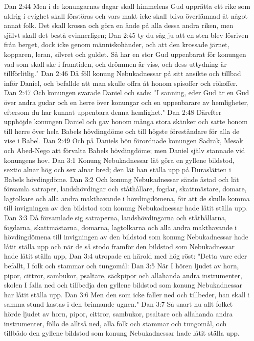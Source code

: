 Dan 2:44  Men i de konungarnas dagar skall himmelens Gud upprätta ett rike som aldrig i evighet skall förstöras och vars makt icke skall bliva överlämnad åt något annat folk. Det skall krossa och göra en ände på alla dessa andra riken, men självt skall det bestå evinnerligen;
Dan 2:45  ty du såg ju att en sten blev lösriven från berget, dock icke genom människohänder, och att den krossade järnet, kopparen, leran, silvret och guldet. Så har en stor Gud uppenbarat för konungen vad som skall ske i framtiden, och drömmen är viss, och dess uttydning är tillförlitlig."
Dan 2:46  Då föll konung Nebukadnessar på sitt ansikte och tillbad inför Daniel, och befallde att man skulle offra åt honom spisoffer och rökoffer.
Dan 2:47  Och konungen svarade Daniel och sade: "I sanning, eder Gud är en Gud över andra gudar och en herre över konungar och en uppenbarare av hemligheter, eftersom du har kunnat uppenbara denna hemlighet."
Dan 2:48  Därefter upphöjde konungen Daniel och gav honom många stora skänker och satte honom till herre över hela Babels hövdingdöme och till högste föreståndare för alla de vise i Babel.
Dan 2:49  Och på Daniels bön förordnade konungen Sadrak, Mesak och Abed-Nego att förvalta Babels hövdingdöme; men Daniel själv stannade vid konungens hov.
Dan 3:1  Konung Nebukadnessar lät göra en gyllene bildstod, sextio alnar hög och sex alnar bred; den lät han ställa upp på Duraslätten i Babels hövdingdöme.
Dan 3:2  Och konung Nebukadnessar sände åstad och lät församla satraper, landshövdingar och ståthållare, fogdar, skattmästare, domare, lagtolkare och alla andra makthavande i hövdingdömena, för att de skulle komma till invigningen av den bildstod som konung Nebukadnessar hade låtit ställa upp.
Dan 3:3  Då församlade sig satraperna, landshövdingarna och ståthållarna, fogdarna, skattmästarna, domarna, lagtolkarna och alla andra makthavande i hövdingdömena till invigningen av den bildstod som konung Nebukadnessar hade låtit ställa upp och när de så stodo framför den bildstod som Nebukadnessar hade låtit ställa upp,
Dan 3:4  utropade en härold med hög röst: "Detta vare eder befallt, I folk och stammar och tungomål:
Dan 3:5  När I hören ljudet av horn, pipor, cittror, sambukor, psaltare, säckpipor och allahanda andra instrumenter, skolen I falla ned och tillbedja den gyllene bildstod som konung Nebukadnessar har låtit ställa upp.
Dan 3:6  Men den som icke faller ned och tillbeder, han skall i samma stund kastas i den brinnande ugnen."
Dan 3:7  Så snart nu allt folket hörde ljudet av horn, pipor, cittror, sambukor, psaltare och allahanda andra instrumenter, föllo de alltså ned, alla folk och stammar och tungomål, och tillbådo den gyllene bildstod som konung Nebukadnessar hade låtit ställa upp.
